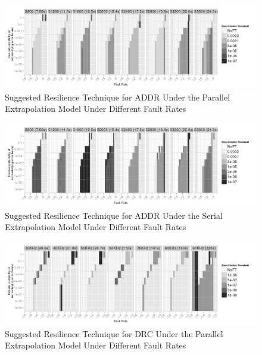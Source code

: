 \documentclass[10pt, conference, compsocconf]{IEEEtran}
\begin{document}
\begin{figure}[ht!]
\centering
\includegraphics[width=7in]{figs/Lasso_Parallel_SuggestedConf.png}
\vspace{-10pt}
\caption{Suggested Resilience Technique for ADDR Under the Parallel Extrapolation Model Under Different Fault Rates}
\vspace{-10pt}
\label{fig:Lasso_Parallel_SuggestedConf}
\end{figure}

\begin{figure}[ht!]
\centering
\includegraphics[width=7in]{figs/Lasso_Serial_SuggestedConf.png}
\vspace{-10pt}
\caption{Suggested Resilience Technique for ADDR Under the Serial Extrapolation Model Under Different Fault Rates}
\vspace{-10pt}
\label{fig:Lasso_Serial_SuggestedConf}
\end{figure}

\begin{figure}[ht!]
\centering
\includegraphics[width=7in]{figs/DRC_Parallel_SuggestedConf.png}
\vspace{-10pt}
\caption{Suggested Resilience Technique for DRC Under the Parallel Extrapolation Model Under Different Fault Rates}
\vspace{-10pt}
\label{fig:DRC_Parallel_SuggestedConf}
\end{figure}
\end{document}
